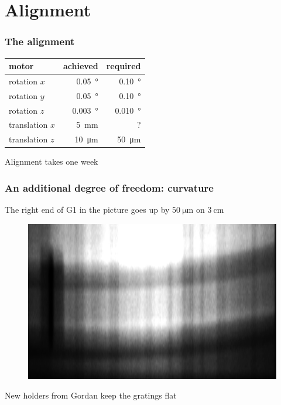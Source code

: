 \documentclass[first,firstsupp]{ETHclass}
\begin{document}
    \section{Alignment}
    \begin{frame}
        \frametitle{The alignment}
        \begin{table}
            \centering
            \begin{tabular}{l r r}
                \toprule
                motor & achieved & required \\
                \midrule
                rotation $x$ & \SI{0.05}{\degree} & \SI{0.10}{\degree}\\
                rotation $y$ & \SI{0.05}{\degree} & \SI{0.10}{\degree}\\
                rotation $z$ & \SI{0.003}{\degree} & \SI{0.010}{\degree}\\
                translation $x$ & \SI{5}{\milli\metre} & ? \\
                translation $z$ & \SI{10}{\micro\metre} & \SI{50}{\micro\metre} \\
                \bottomrule
            \end{tabular}
        \end{table}
        Alignment takes one week
    \end{frame}
    \begin{frame}
        \frametitle{An additional degree of freedom: curvature}
            The right end of G1 in the picture goes up by
        $\SI{50}{\micro\metre}$ on $\SI{3}{\centi\metre}$
        \begin{figure}[h]
            \centering
            \includegraphics[height=0.5\textheight]{bentG1.pdf}
        \end{figure}
        New holders from Gordan keep the gratings flat
    \end{frame}
\end{document}
